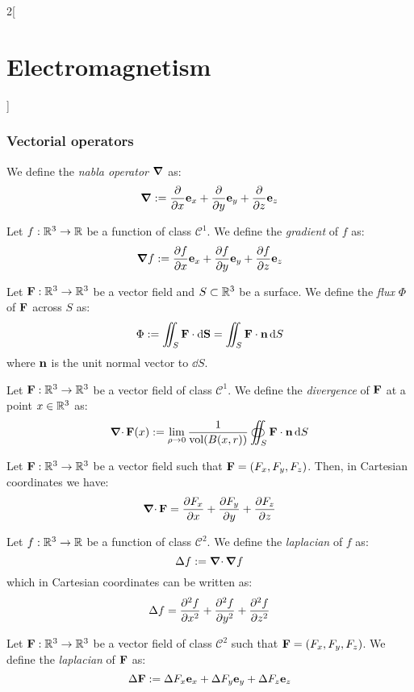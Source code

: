 \documentclass[../../../main_physics.tex]{subfiles}
\begin{document}
\begin{multicols}{2}[\section{Electromagnetism}]
  \subsubsection{Vectorial operators}
  \begin{definition}
    We define the \emph{nabla operator} $\grad$ as: $$\grad:=\pdv{}{x}\boldsymbol{\mathrm{e}}_x+\pdv{}{y}\boldsymbol{\mathrm{e}}_y+\pdv{}{z}\boldsymbol{\mathrm{e}}_z$$
  \end{definition}
  \begin{definition}[Gradient]
    Let $f:\mathbb{R}^3\rightarrow\mathbb{R}$ be a function of class $\mathcal{C}^1$. We define the \emph{gradient} of $f$ as: $$\grad f:=\pdv{f}{x}\boldsymbol{\mathrm{e}}_x+\pdv{f}{y}\boldsymbol{\mathrm{e}}_y+\pdv{f}{z}\boldsymbol{\mathrm{e}}_z$$
  \end{definition}
  \begin{definition}[Flux]
    Let $\boldsymbol{\mathrm{F}}:\mathbb{R}^3\rightarrow\mathbb{R}^3$ be a vector field and $S\subset\mathbb{R}^3$ be a surface. We define the \emph{flux} $\Phi$ of $\boldsymbol{\mathrm{F}}$ across $S$ as:
    $$\Phi:=\iint_S\boldsymbol{\mathrm{F}}\cdot \dd{\boldsymbol{\mathrm{S}}}=\iint_S\boldsymbol{\mathrm{F}}\cdot\boldsymbol{\mathrm{n}} \dd{S}$$
    where $\boldsymbol{\mathrm{n}}$ is the unit normal vector to $\dd{S}$.
  \end{definition}
  \begin{definition}[Divergence]
    Let $\boldsymbol{\mathrm{F}}:\mathbb{R}^3\rightarrow\mathbb{R}^3$ be a vector field of class $\mathcal{C}^1$. We define the \emph{divergence} of $\boldsymbol{\mathrm{F}}$ at a point $x\in\mathbb{R}^3$ as:
    $$\operatorname{\boldsymbol{\mathrm{\nabla}}\cdot} \boldsymbol{\mathrm{F}}(x):=\lim_{\rho\to 0}\frac{1}{\text{vol}(B(x,r))}\oiint_{S}\boldsymbol{\mathrm{F}}\cdot\boldsymbol{\mathrm{n}} \dd{S}$$
  \end{definition}
  \begin{proposition}
    Let $\boldsymbol{\mathrm{F}}:\mathbb{R}^3\rightarrow\mathbb{R}^3$ be a vector field such that $\boldsymbol{\mathrm{F}}=(F_x,F_y,F_z)$. Then, in Cartesian coordinates we have: $$\operatorname{\boldsymbol{\mathrm{\nabla}}\cdot} \boldsymbol{\mathrm{F}}=\pdv{F_x}{x}+\pdv{F_y}{y}+\pdv{F_z}{z}$$
  \end{proposition}
  \begin{definition}[Laplacian]
    Let $f:\mathbb{R}^3\rightarrow\mathbb{R}$ be a function of class $\mathcal{C}^2$. We define the \emph{laplacian} of $f$ as: $$\Delta f:=\operatorname{\boldsymbol{\mathrm{\nabla}}\cdot}\grad f$$
    which in Cartesian coordinates can be written as:
    $$\Delta f=\pdv[2]{f}{x}+\pdv[2]{f}{y}+\pdv[2]{f}{z}$$
  \end{definition}
  \begin{definition}
    Let $\boldsymbol{\mathrm{F}}:\mathbb{R}^3\rightarrow\mathbb{R}^3$ be a vector field of class $\mathcal{C}^2$ such that $\boldsymbol{\mathrm{F}}=(F_x,F_y,F_z)$. We define the \emph{laplacian} of $\boldsymbol{\mathrm{F}}$ as: $$\Delta\boldsymbol{\mathrm{F}}:=\Delta F_x\boldsymbol{\mathrm{e}}_x+\Delta F_y\boldsymbol{\mathrm{e}}_y+\Delta F_z\boldsymbol{\mathrm{e}}_z$$
  \end{definition}

\end{multicols}
\end{document}

